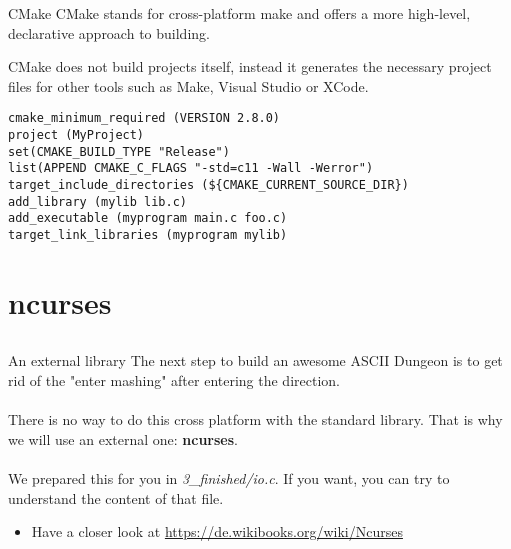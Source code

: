\begin{frame}[fragile = singleslide]{CMake}
	CMake stands for cross-platform make and offers a more high-level, declarative approach to building.

	CMake does not build projects itself, instead it generates the necessary project files for other tools such as Make, Visual Studio or XCode.

	\begin{lstlisting}[escapeinside=§]
cmake_minimum_required (VERSION 2.8.0)
project (MyProject)
set(CMAKE_BUILD_TYPE "Release")
list(APPEND CMAKE_C_FLAGS "-std=c11 -Wall -Werror")
target_include_directories (${CMAKE_CURRENT_SOURCE_DIR})
add_library (mylib lib.c)
add_executable (myprogram main.c foo.c)
target_link_libraries (myprogram mylib)
\end{lstlisting}
\end{frame}

\section{ncurses}
\subsection{}

\begin{frame}{An external library}
	The next step to build an awesome ASCII Dungeon is to get rid of the "enter mashing" after entering the direction.\\\ \\
	There is no way to do this cross platform with the standard library. That is why we will use an external one: \textbf{ncurses}.\\\ \\
	We prepared this for you in \textit{3\_finished/io.c}. If you want, you can try to understand the content of that file.
	\begin{itemize}
		\item Have a closer look at \url{https://de.wikibooks.org/wiki/Ncurses}
	\end{itemize}

\end{frame}


